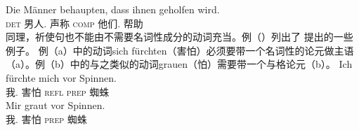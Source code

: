 \ea
\gll Die Männer behaupten, dass ihnen geholfen wird.\\
	 \textsc{det} 男人.\nom{} 声称 \textsc{comp} 他们.\dat{} 帮助 \passiveprs\\
\z
%
同理，祈使句也不能由不需要名词性成分的动词充当。例（）列出了 \citet[]{Reis82}提出的一些例子。
\eal
{}
\zl
例（a）中的动词sich fürchten（害怕）必须要带一个名词性的论元做主语（a）。例（b）中的与之类似的动词grauen（怕）需要带一个与格论元（b）。
\eal
\ex
\gll Ich fürchte mich vor Spinnen.\\
	 我.\nom{} 害怕 \textsc{refl} \textsc{prep} 蜘蛛\\
\ex 
\gll Mir graut vor Spinnen.\\
	 我.\dat{} 害怕 \textsc{prep} 蜘蛛\\
\zl

